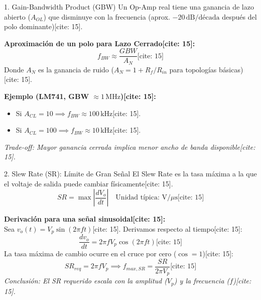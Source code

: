 \documentclass[aspectratio=169]{beamer}
\begin{document}
\begin{frame}{1. Gain-Bandwidth Product (GBW)}
    Un Op-Amp real tiene una ganancia de lazo abierto ($A_{OL}$) que disminuye con la frecuencia (aprox. $-20\,\text{dB/década}$ después del polo dominante)[cite: 15].
    
    \textbf{Aproximación de un polo para Lazo Cerrado[cite: 15]:}
    \begin{equation*}
        \boxed{ f_{BW} \approx \frac{GBW}{A_N} } \text{[cite: 15]}
    \end{equation*}
    Donde $A_N$ es la ganancia de ruido ($A_N = 1 + R_f/R_{in}$ para topologías básicas)[cite: 15].
    
    \vspace{0.2cm}
    \textbf{Ejemplo (LM741, GBW $\approx 1\,\text{MHz}$)[cite: 15]:}
    \begin{itemize}
        \item Si $A_{CL} = 10 \implies f_{BW} \approx 100\,\text{kHz}$[cite: 15].
        \item Si $A_{CL} = 100 \implies f_{BW} \approx 10\,\text{kHz}$[cite: 15].
    \end{itemize}
    \textit{Trade-off: Mayor ganancia cerrada implica menor ancho de banda disponible[cite: 15].}
\end{frame}

\begin{frame}{2. Slew Rate (SR): Límite de Gran Señal}
    El Slew Rate es la tasa máxima a la que el voltaje de salida puede cambiar físicamente[cite: 15].
    \begin{equation*}
        \boxed{ SR = \max\left|\frac{dV_o}{dt}\right| } \quad \text{Unidad típica: } \text{V}/\mu\text{s} \text{[cite: 15]}
    \end{equation*}
    
    \textbf{Derivación para una señal sinusoidal[cite: 15]:} \\
    Sea $v_o(t) = V_p \sin(2\pi f t)$[cite: 15]. Derivamos respecto al tiempo[cite: 15]:
    \begin{equation*}
        \frac{dv_o}{dt} = 2\pi f V_p \cos(2\pi f t) \text{[cite: 15]}
    \end{equation*}
    La tasa máxima de cambio ocurre en el cruce por cero ($\cos=1$)[cite: 15]:
    \begin{equation*}
        \boxed{ SR_{req} = 2\pi f V_p } \implies \boxed{ f_{max,SR} = \frac{SR}{2\pi V_p} } \text{[cite: 15]}
    \end{equation*}
    \textit{Conclusión: El SR requerido escala con la amplitud ($V_p$) y la frecuencia ($f$)[cite: 15].}
\end{frame}
\end{document}
